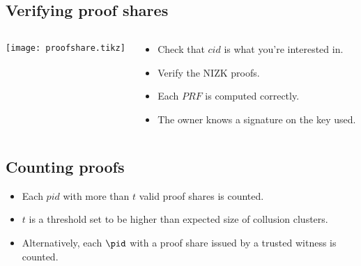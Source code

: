 \subsection{Verifying proof shares}

\begin{frame}
  \begin{columns}
    \begin{column}{0.6\linewidth}
      \tiny
      \texttt{[image: proofshare.tikz]}
    \end{column}

    \begin{column}{0.5\linewidth}
      \begin{itemize}
        \item Check that \(cid\) is what you're interested in.
        \item Verify the \ac{NIZK} proofs.
        \item Each \(PRF\) is computed correctly.
        \item The owner knows a signature on the key used.
      \end{itemize}
    \end{column}
  \end{columns}
\end{frame}

\subsection{Counting proofs}

\begin{frame}
  \begin{example}
    \begin{itemize}
      \item Each \(pid\) with more than \(t\) valid proof shares is counted.
      \item \(t\) is a threshold set to be higher than expected size of collusion 
        clusters.
    \end{itemize}
  \end{example}

  \begin{example}
    \begin{itemize}
      \item Alternatively, each \(\pid\) with a proof share issued by a trusted 
        witness is counted.
    \end{itemize}
  \end{example}
\end{frame}


